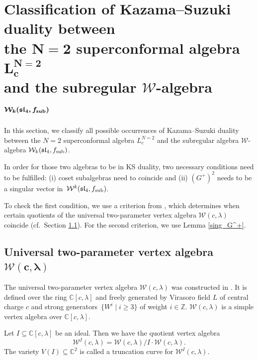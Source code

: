 \documentclass[pdftex]{sigma}
\numberwithin{equation}{section}
\begin{document}
	
\section[Classification of Kazama--Suzuki duality between the N=2 superconformal algebra L\^{}N=2\_c and the subregular W-algebra W\_k(sl\_4, f\_sub]{Classification of Kazama--Suzuki duality between\\ the $\boldsymbol{N=2}$ superconformal algebra $\boldsymbol{L^{N=2}_c}$\\ and the subregular $\boldsymbol{\mathcal{W}}$-algebra $\boldsymbol{\mathcal{W}_{k}(\mathfrak{sl}_4, f_{\rm sub})}$} \label{KS_gen}

In this section, we classify all possible occurrences of Kazama--Suzuki duality between the $N=2$ superconformal algebra $L^{N=2}_c$ and the subregular algebra $\mathcal{W}$-algebra $\mathcal{W}_{k}(\mathfrak{sl}_4, f_{\rm sub})$.

In order for those two algebras to be in KS duality, two necessary conditions need to be fulfilled: (i) coset subalgebras need to coincide and (ii) $(G^+)^2$ needs to be a singular vector in~$\mathcal W^k(\mathfrak{sl}_4, f_{\rm sub})$.

To check the first condition, we use a criterion from \cite{Linshaw}, which determines when certain quotients of the universal two-parameter vertex algebra $\mathcal W (c, \lambda)$ coincide (cf.\ Section \ref{univ_W}). For the second criterion, we use Lemma \ref{sing_G^+}.

\subsection[Universal two-parameter vertex algebra W (c, lambda)]{Universal two-parameter vertex algebra $\boldsymbol{\mathcal W (c, \lambda)}$} \label{univ_W}
 The universal two-parameter vertex algebra $\mathcal W (c, \lambda)$ was constructed in \cite{Linshaw}. It is defined over the ring $\mathbb{C}[c, \lambda]$ and freely generated by Virasoro field $L$ of central charge $c$ and strong generators~${\big\{W^i \mid i \geq 3\big\}}$ of weight $i \in \mathbb{Z}$. $\mathcal W (c, \lambda)$ is a simple vertex algebra over $\mathbb{C}[c, \lambda]$.

 Let $I \subseteq \mathbb{C}[c, \lambda]$ be an ideal. Then we have the quotient vertex algebra
 \[
 \mathcal W ^{I}(c, \lambda) = \mathcal W (c, \lambda)/ I \cdot \mathcal W (c, \lambda).
 \]
 The variety $V(I)\subseteq \mathbb{C}^2 $ is called a truncation curve for $\mathcal W ^{I}(c, \lambda)$.
\end{document}
